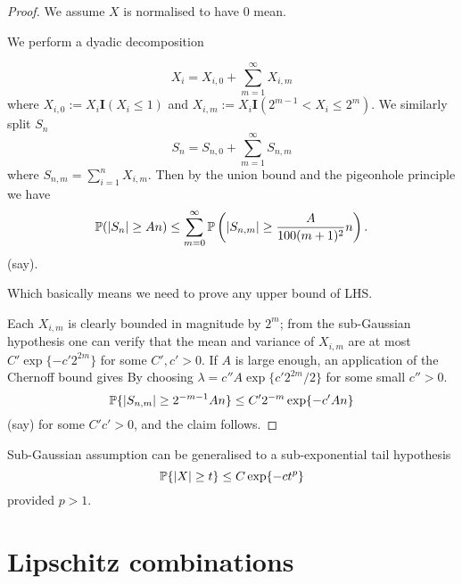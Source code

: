 \begin{proof}
    We assume $X$ is normalised to have 0 mean.

    We perform a dyadic decomposition

    \begin{equation*}
        X_i = X_{i,0} + \sum_{m=1}^\infty X_{i,m}
    \end{equation*}
    where $X_{i,0} := X_i \mathbf{I} (X_i \leq 1)$ and $X_{i,m} := X_i \mathbf{I} (2^{m-1} < X_i \leq 2^m)$. We similarly split $S_n$
    \begin{equation*}
        S_n = S_{n,0}+\sum_{m=1}^\infty S_{n,m}
    \end{equation*}
    where $S_{n,m} = \sum_{i=1}^n X_{i,m}$. Then by the union bound and the pigeonhole principle we have
    \begin{equation*}
        \mathbb{P}(|S_n| \geq An) \leq \sum_{m=0}^\infty \mathbb{P} \left(|S_{n,m}| \geq \frac{A}{100(m+1)^2}n\right).
    \end{equation*}
    (say).

    Which basically means we need to prove any upper bound of LHS.

    Each $X_{i,m}$ is clearly bounded in magnitude by $2^m$; from the sub-Gaussian hypothesis one can verify that the mean and variance of $X_{i,m}$ are at most $C'\exp\{-c'2^{2m}\}$ for some $C',c' >0$. If $A$ is large enough, an application of the Chernoff bound gives
    By choosing $\lambda = c''A\exp\{c' 2^{2m}/2\}$ for some small $c''>0$.
    \begin{equation*}
        \mathbb{P}\{|S_{n,m}| \geq 2^{-m-1}An\} \leq C'2^{-m}\exp\{-c'An\}
    \end{equation*}
    (say) for some $C'c'>0$, and the claim follows.
\end{proof}

Sub-Gaussian assumption can be generalised to a sub-exponential tail hypothesis
\begin{equation*}
    \mathbb{P}\{|X|\geq t\} \leq C\exp\{-ct^p\}
\end{equation*}
provided $p>1$.

\section{Lipschitz combinations}

